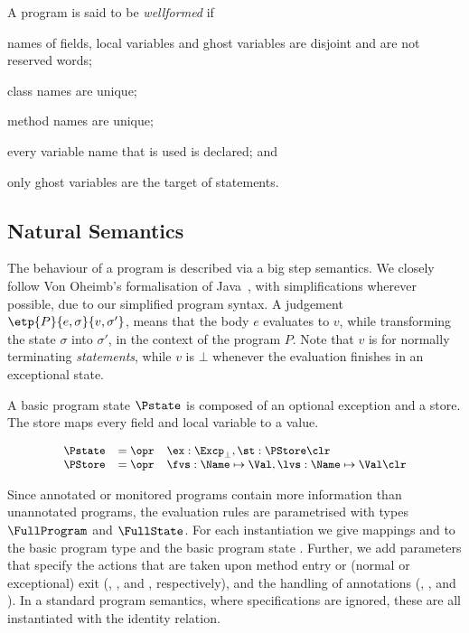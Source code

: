 A program is said to be \emph{wellformed} if
\begin{inparaenum}
\item names of fields, local variables and ghost variables are
disjoint and are not reserved words;
\item class names are unique;
\item method names are unique;
\item every variable name that is used is declared; and
\item only ghost variables are the target of \Set statements.
\end{inparaenum}

\subsection{Natural Semantics}\label{SecSemantics}
The behaviour of a program is described via a big step semantics. We
closely follow Von Oheimb's formalisation of Java~\cite{Oheimb01},
with simplifications wherever possible, due to our simplified
program syntax. A judgement $\etp{P}{e,\sigma}{v,\sigma'}$, means that the body
$e$ evaluates to $v$, while transforming the state $\sigma$ into $\sigma'$, in
the context of the program \(P\). Note that \(v\) is \One for
normally terminating \emph{statements}, while \(v\) is \(\bot\) whenever
the evaluation finishes in an exceptional state.

A basic program state \(\Pstate\) is composed of an optional exception
and a store.  The store maps every field and local variable to a
value.

\[
{\small
\begin{array}{rcl}
\Pstate & = \opr & \ex : \Excp_{\bot}, \st : \PStore \clr\\
\PStore & = \opr & \fvs : \Name \mapsto \Val, \lvs : \Name \mapsto \Val \clr
\end{array}}
\]

Since annotated or monitored programs
contain more information than unannotated programs, the
evaluation rules are parametrised with types
\(\FullProgram\) and \(\FullState\). For each instantiation we give
mappings \program and \progstate to the basic program type \Program
and the basic program state \Pstate. Further, we add parameters that
specify the actions that are taken upon method entry or (normal or
exceptional) exit (\gammain, \gammanorm, and \gammaexc, respectively),
and the handling of annotations (\deltaset, \deltaassert, and
\deltacase).  In a standard program semantics, where specifications
are ignored, these are all instantiated with the identity relation.

